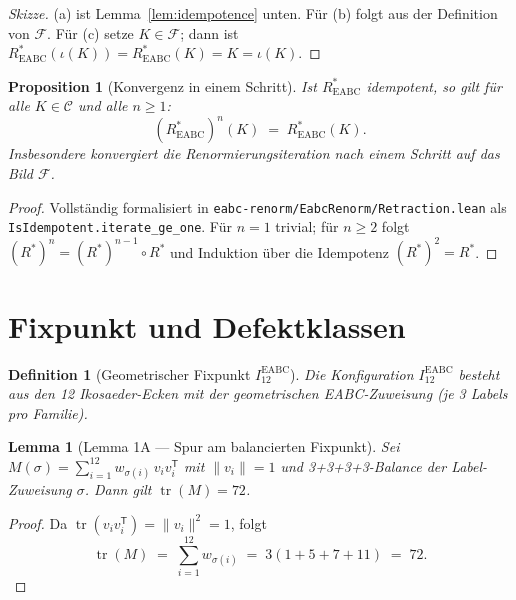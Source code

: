 \documentclass[11pt,a4paper]{article}
\newtheorem{definition}{Definition}
\newtheorem{proposition}{Proposition}
\newtheorem{lemma}{Lemma}
\begin{document}
	\begin{proof}[Skizze]
		(a) ist Lemma~\ref{lem:idempotence} unten.
		Für (b) folgt aus der Definition von $\mathcal{F}$.
		Für (c) setze $K\in\mathcal{F}$; dann ist
		$R^*_{\mathrm{EABC}}(\iota(K))=R^*_{\mathrm{EABC}}(K)=K=\iota(K)$.
	\end{proof}
	
	\begin{proposition}[Konvergenz in einem Schritt]
		\label{prop:convergence}
		Ist $R^*_{\mathrm{EABC}}$ idempotent, so gilt für alle $K\in\mathcal{C}$ und
		alle $n\ge 1$:
		\[
		(R^*_{\mathrm{EABC}})^n(K) \;=\; R^*_{\mathrm{EABC}}(K).
		\]
		Insbesondere konvergiert die Renormierungsiteration nach \emph{einem} Schritt
		auf das Bild $\mathcal{F}$.
	\end{proposition}
	
	\begin{proof}
		Vollständig formalisiert in \texttt{eabc-renorm/EabcRenorm/Retraction.lean}
		als \texttt{IsIdempotent.iterate\_ge\_one}.
		Für $n=1$ trivial; für $n\ge 2$ folgt $(R^*)^n=(R^*)^{n-1}\circ R^*$
		und Induktion über die Idempotenz $(R^*)^2=R^*$.
	\end{proof}
	
	\section{Fixpunkt und Defektklassen}
	
	\begin{definition}[Geometrischer Fixpunkt $I_{12}^{\mathrm{EABC}}$]
		Die Konfiguration $I_{12}^{\mathrm{EABC}}$ besteht aus den 12 Ikosaeder-Ecken
		mit der geometrischen EABC-Zuweisung (je 3 Labels pro Familie).
	\end{definition}
	
	\begin{lemma}[Lemma 1A — Spur am balancierten Fixpunkt]
		\label{lem:trace}
		Sei $M(\sigma)=\sum_{i=1}^{12} w_{\sigma(i)}\, v_i v_i^{\mathsf T}$ mit $\|v_i\|=1$
		und 3+3+3+3-Balance der Label-Zuweisung $\sigma$.
		Dann gilt $\operatorname{tr}(M)=72$.
	\end{lemma}
	
	\begin{proof}
		Da $\operatorname{tr}(v_i v_i^{\mathsf T})=\|v_i\|^2=1$, folgt
		\[
		\operatorname{tr}(M)
		\;=\;
		\sum_{i=1}^{12} w_{\sigma(i)}
		\;=\;
		3(1+5+7+11)
		\;=\;
		72.
		\]
	\end{proof}
	
\end{document}
